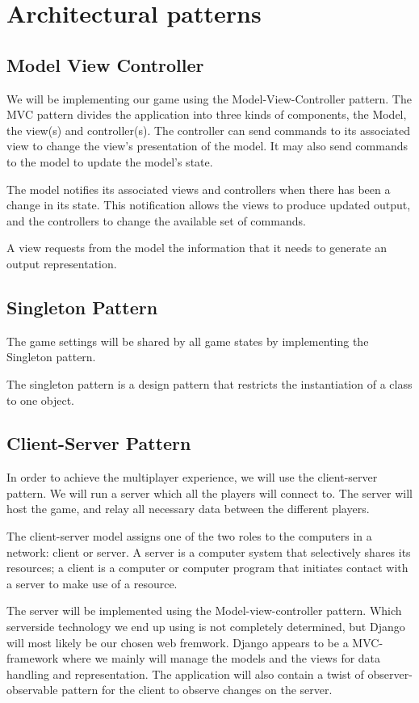 \section{Architectural patterns}
\label{architecturalpatterns}

\subsection{Model View Controller}
We will be implementing our game using the Model-View-Controller pattern.
The MVC pattern divides the application into three kinds of components, the Model, the view(s) and controller(s). 
The controller can send commands to its associated view to change the view's presentation of the model. It may also send commands to the model to update the model's state.

The model notifies its associated views and controllers when there has been a change in its state. This notification allows the views to produce updated output, and the controllers to change the available set of commands.

A view requests from the model the information that it needs to generate an output representation.


\subsection{Singleton Pattern}
The game settings will be shared by all game states by implementing the
Singleton pattern.

The singleton pattern is a design pattern that restricts the instantiation of a class to one object.


\subsection{Client-Server Pattern}
In order to achieve the multiplayer experience, we will use the client-server
pattern. We will run a server which all the players will connect to. The server
will host the game, and relay all necessary data between the different players.

The client-server model assigns one of the two roles to the computers in a network: client or server. A server is a computer system that selectively shares its resources; a client is a computer or computer program that initiates contact with a server to make use of a resource.


The server will be implemented using the Model-view-controller pattern. Which
serverside technology we end up using is not completely determined, but Django
will most likely be our chosen web fremwork. Django appears to be a
MVC-framework where we mainly will manage the models and the views for data
handling and representation. The application will also contain a twist of
observer-observable pattern for the client to observe changes on the server.
